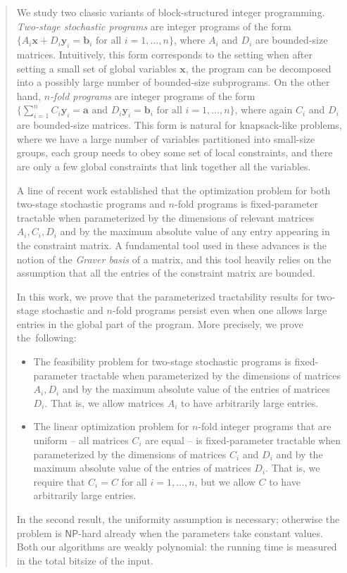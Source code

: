 \documentclass{article}
\newcommand{\tup}[1]{{\mathbf{#1}}}
\newcommand{\xx}{\tup x}
\newcommand{\yy}{\tup y}
\newcommand{\av}{\tup a}
\newcommand{\bb}{\tup b}
\begin{document}
\begin{abstract}
We study two classic variants of block-structured integer programming. {\em{Two-stage stochastic programs}} are integer programs of the form $\{A_i \xx + D_i \yy_i = \bb_i\textrm{ for all }i=1,\ldots,n\}$, where $A_i$ and $D_i$ are bounded-size matrices. Intuitively, this form corresponds to the setting when after setting a small set of global variables $\xx$, the program can be decomposed into a possibly large number of bounded-size subprograms.
On the other hand, {\em{$n$-fold programs}} are integer programs of the form $\{{\sum_{i=1}^n C_i\yy_i=\av} \textrm{ and } D_i\yy_i=\bb_i\textrm{ for all }i=1,\ldots,n\}$, where again $C_i$ and $D_i$ are bounded-size matrices. This form is natural for knapsack-like problems, where we have a large number of variables partitioned into small-size groups, each group needs to obey some set of local constraints, and there are only a few global constraints that link together all the variables.

A line of recent work established that the optimization problem for both two-stage stochastic programs and $n$-fold programs is fixed-parameter tractable when parameterized by the dimensions of relevant matrices $A_i,C_i,D_i$ and by the maximum absolute value of any entry appearing in the constraint matrix. A fundamental tool used in these advances is the notion of the {\em{Graver basis}} of a matrix, and this tool heavily relies on the assumption that all the entries of the constraint matrix are bounded.

In this work, we prove that the parameterized tractability results for two-stage stochastic and $n$-fold programs persist even when one allows large entries in the global part of the program. More precisely, we prove the~following:
\begin{itemize}[nosep]
 \item The feasibility problem for two-stage stochastic programs is fixed-parameter tractable when parameterized by the dimensions of matrices $A_i,D_i$ and by the maximum absolute value of the entries of matrices $D_i$. That is, we allow matrices $A_i$ to have arbitrarily large entries.
 \item The linear optimization problem for $n$-fold integer programs that are uniform -- all matrices $C_i$ are equal -- is fixed-parameter tractable when parameterized by the dimensions of matrices $C_i$ and $D_i$ and by the maximum absolute value of the entries of matrices $D_i$. That is, we require that $C_i=C$ for all $i=1,\ldots,n$, but we allow $C$ to have arbitrarily large entries.
\end{itemize}
In the second result, the uniformity assumption is necessary; otherwise the problem is $\mathsf{NP}$-hard already when the parameters take constant values. Both our algorithms are weakly polynomial: the running time is measured in the total bitsize of the input.


\end{abstract}
\end{document}
